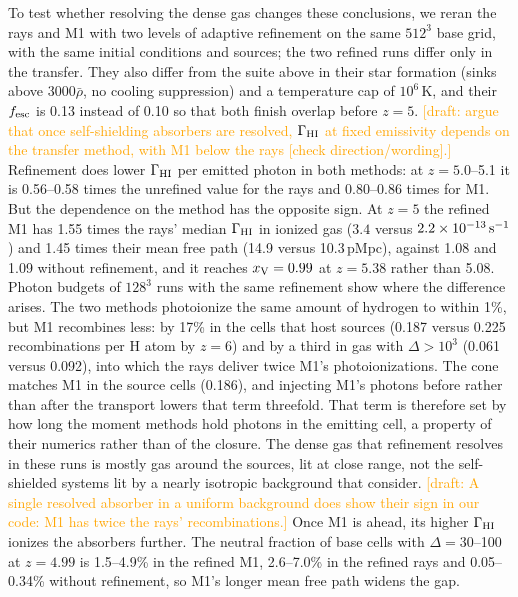 \documentclass[iop]{openjournal}
\renewcommand{\draft}[1]{\textcolor{orange}{[draft: #1]}}%
\newcommand{\xv}{x_{\rm V}}
\begin{document}
To test whether resolving the dense gas changes these conclusions, we reran the rays and M1 with two levels of adaptive refinement on the same $512^3$ base grid, with the same initial conditions and sources; the two refined runs differ only in the transfer. They also differ from the suite above in their star formation (sinks above $3000\bar\rho$, no cooling suppression) and a temperature cap of $10^6$\,K, and their $f_{\rm esc}$ is 0.13 instead of 0.10 so that both finish overlap before $z=5$. \draft{\citet{wu21} argue that once self-shielding absorbers are resolved, $\Gamma_{\rm HI}$ at fixed emissivity depends on the transfer method, with M1 below the rays [check direction/wording].} Refinement does lower $\Gamma_{\rm HI}$ per emitted photon in both methods: at $z=5.0$--5.1 it is 0.56--0.58 times the unrefined value for the rays and 0.80--0.86 times for M1. But the dependence on the method has the opposite sign. At $z=5$ the refined M1 has 1.55 times the rays' median $\Gamma_{\rm HI}$ in ionized gas ($3.4$ versus $2.2\times10^{-13}\,{\rm s^{-1}}$) and 1.45 times their mean free path (14.9 versus 10.3\,pMpc), against 1.08 and 1.09 without refinement, and it reaches $\xv=0.99$ at $z=5.38$ rather than 5.08. Photon budgets of $128^3$ runs with the same refinement show where the difference arises. The two methods photoionize the same amount of hydrogen to within 1\%, but M1 recombines less: by 17\% in the cells that host sources (0.187 versus 0.225 recombinations per H atom by $z=6$) and by a third in gas with $\Delta>10^3$ (0.061 versus 0.092), into which the rays deliver twice M1's photoionizations. The cone matches M1 in the source cells (0.186), and injecting M1's photons before rather than after the transport lowers that term threefold. That term is therefore set by how long the moment methods hold photons in the emitting cell, a property of their numerics rather than of the closure. The dense gas that refinement resolves in these runs is mostly gas around the sources, lit at close range, not the self-shielded systems lit by a nearly isotropic background that \citet{wu21} consider. \draft{A single resolved absorber in a uniform background does show their sign in our code: M1 has twice the rays' recombinations.} Once M1 is ahead, its higher $\Gamma_{\rm HI}$ ionizes the absorbers further. The neutral fraction of base cells with $\Delta=30$--100 at $z=4.99$ is 1.5--4.9\% in the refined M1, 2.6--7.0\% in the refined rays and 0.05--0.34\% without refinement, so M1's longer mean free path widens the gap.
\end{document}
